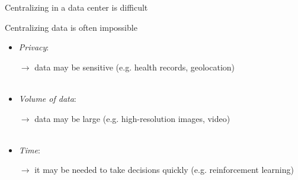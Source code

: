 \documentclass[aspectratio=169,14pt]{beamer}
\begin{document}
\begin{frame}[t]{Centralizing in a data center is difficult}

  Centralizing data is often impossible
  \begin{itemize}
  \item \emph{Privacy}:

    {\small
    $\rightarrow$ data may be sensitive (e.g. health records, geolocation)
    }
    \\
    ~

  \item \emph{Volume of data}:

    {\small
      $\rightarrow$ data may be large (e.g. high-resolution images, video)
    }
    \\
    ~
    
  \item \emph{Time}:

    {\small
    $\rightarrow$ it may be needed to take decisions quickly (e.g. reinforcement learning)
    }
    
  \end{itemize}

\end{frame}



    
    

    
        
  
\end{document}
